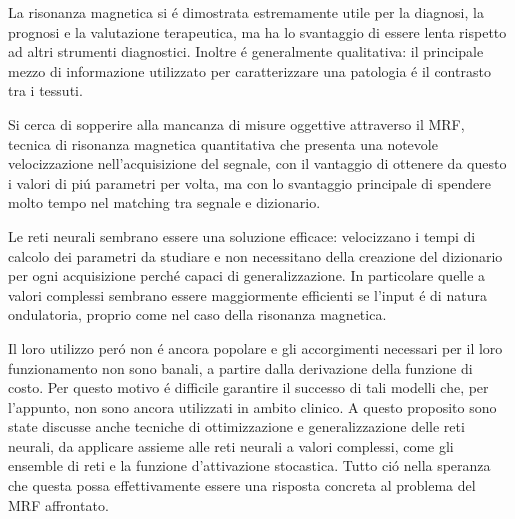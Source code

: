 \documentclass[a4paper,12pt]{report}
\begin{document}
 La risonanza magnetica si \'e dimostrata estremamente utile per la diagnosi, la prognosi e la valutazione terapeutica, ma ha lo svantaggio di essere lenta rispetto ad altri strumenti diagnostici. 
 Inoltre \'e generalmente qualitativa: il principale mezzo di informazione utilizzato per caratterizzare una patologia \'e il contrasto tra i tessuti.
 
 Si cerca di sopperire alla mancanza di misure oggettive attraverso il MRF, tecnica di risonanza magnetica quantitativa che presenta una notevole velocizzazione nell'acquisizione del segnale, con il vantaggio di ottenere da questo i valori di pi\'u  parametri per volta, ma con lo svantaggio principale di spendere molto tempo nel matching tra segnale e dizionario.
 
 Le reti neurali sembrano essere una soluzione efficace: velocizzano i tempi di calcolo dei parametri da studiare e non necessitano della creazione del dizionario per ogni acquisizione perch\'e capaci di generalizzazione. 
 In particolare quelle a valori complessi sembrano essere maggiormente efficienti se l'input \'e di natura ondulatoria, proprio come nel caso della risonanza magnetica.
 
 Il loro utilizzo per\'o non \'e ancora popolare e gli accorgimenti necessari per il loro funzionamento non sono banali, a partire dalla derivazione della funzione di costo.
 Per questo motivo \'e difficile garantire il successo di tali modelli che, per l'appunto, non sono ancora utilizzati in ambito clinico.
 A questo proposito sono state discusse anche tecniche di ottimizzazione e generalizzazione delle reti neurali, da applicare assieme alle reti neurali a valori complessi, come gli ensemble di reti e la funzione d'attivazione stocastica.
 Tutto ci\'o nella speranza che questa possa effettivamente essere una risposta concreta al problema del MRF affrontato.
 
 
 
 
\end{document}
